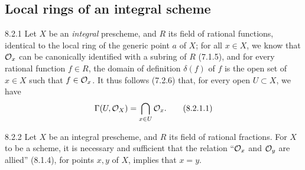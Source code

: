 \documentclass[../main.tex]{subfiles}
\begin{document}
\subsection{Local rings of an integral scheme}

\begin{cx}{8.2.1}
    Let $X$ be an \emph{integral} prescheme, and $R$ its field of rational functions, identical to the local ring of the generic point $a$ of $X$; for all $x\in X$, we know that $\mathcal{O}_x$ can be canonically identified with a subring of $R$ (7.1.5), and for every rational function $f\in R$, the domain of definition $\delta(f)$ of $f$ is the open set of $x\in X$ such that $f\in\mathcal{O}_x$.
    It thus follows (7.2.6) that, for every open $U\subset X$, we have
    \begin{equation*}
        \Gamma(U,\mathcal{O}_X) = \bigcap_{x\in U}\mathcal{O}_x.\tag{8.2.1.1}
    \end{equation*}
\end{cx}

\begin{cx}[Proposition]{8.2.2}
    Let $X$ be an integral prescheme, and $R$ its field of rational fractions.
    For $X$ to be a scheme, it is necessary and sufficient that the relation ``$\mathcal{O}_x$ and $\mathcal{O}_y$ are allied'' (8.1.4), for points $x,y$ of $X$, implies that $x=y$.
\end{cx}
\end{document}
